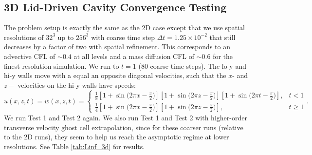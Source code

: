 \documentclass[final]{siamltex}
\begin{document}
\subsection{3D Lid-Driven Cavity Convergence Testing}
The problem setup is exactly the same as the 2D case except that we use spatial
resolutions of $32^3$ up to $256^3$ with coarse time step $\Delta t=1.25\times 10^{-2}$
that still decreases by a factor of two with spatial refinement.  This corresponds
to an advective CFL of $\sim 0.4$ at all levels and a mass diffusion CFL of
$\sim 0.6$ for the finest resolution simulation.  We run to $t=1$ (80 coarse time steps).
The lo-y and hi-y walls move with
a equal an opposite diagonal velocities, such that the $x$- and $z-$ velocities on
the hi-y walls have speeds:
\begin{equation}
u(x,z,t) = w(x,z,t) = 
\begin{cases}
\frac{1}{8}\left[1 + \sin{(2\pi x - \frac{\pi}{2}})\right]
           \left[1 + \sin{(2\pi z - \frac{\pi}{2}})\right]
           \left[1 + \sin{(2\pi t - \frac{\pi}{2}})\right], & t < 1\\
\frac{1}{4}\left[1 + \sin{(2\pi x - \frac{\pi}{2}})\right]
           \left[1 + \sin{(2\pi z - \frac{\pi}{2}})\right], & t \ge 1
\end{cases}.
\end{equation}
We run Test 1 and Test 2 again.  We also run Test 1 and Test 2 with higher-order transverse
velocity ghost cell extrapolation, since for these coarser runs (relative to the 2D runs),
they seem to help us reach the asymptotic regime at lower resolutions.
See Table \ref{tab:Linf_3d} for results.
\end{document}
